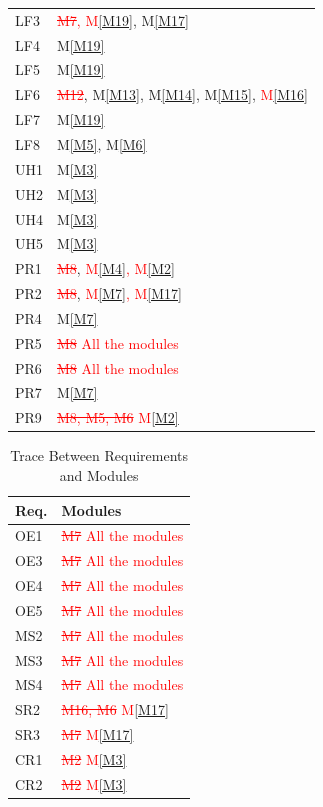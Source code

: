 \documentclass[12pt, titlepage]{article}
\newcommand{\mref}[1]{M\ref{#1}}
\begin{document}
\begin{table}[H]
\begin{tabular}{p{} p{}}
LF3 & \textcolor{red}{\sout{M7}, \mref{M19}}, \mref{M17}\\
LF4 & \mref{M19}\\
LF5 & \mref{M19}\\
LF6 & \textcolor{red}{\sout{M12}}, \mref{M13}, \mref{M14}, \mref{M15}, \textcolor{red}{\mref{M16}}\\
LF7 & \mref{M19}\\
LF8 & \mref{M5}, \mref{M6}\\
UH1 & \mref{M3}\\
UH2 & \mref{M3}\\
UH4 & \mref{M3}\\
UH5 & \mref{M3}\\
PR1 & \textcolor{red}{\sout{M8}}, \textcolor{red}{\mref{M4}, \mref{M2}}\\
PR2 & \textcolor{red}{\sout{M8}}, \textcolor{red}{\mref{M7}, \mref{M17}}\\
PR4 & \mref{M7}\\
PR5 & \textcolor{red}{\sout{M8} All the modules}\\
PR6 & \textcolor{red}{\sout{M8} All the modules}\\
PR7 & \mref{M7}\\
PR9 & \textcolor{red}{\sout{M8, M5, M6} \mref{M2}}\\
\bottomrule
\end{tabular}
\end{table}

\begin{table}[H]
\centering
\begin{tabular}{p{} p{}}
\toprule
\textbf{Req.} & \textbf{Modules}\\
\midrule
OE1 & \textcolor{red}{\sout{M7} All the modules}\\
OE3 & \textcolor{red}{\sout{M7} All the modules}\\
OE4 & \textcolor{red}{\sout{M7} All the modules}\\
OE5 & \textcolor{red}{\sout{M7} All the modules}\\
MS2 & \textcolor{red}{\sout{M7} All the modules}\\
MS3 & \textcolor{red}{\sout{M7} All the modules}\\
MS4 & \textcolor{red}{\sout{M7} All the modules}\\
SR2 & \textcolor{red}{\sout{M16, M6} \mref{M17}}\\
SR3 & \textcolor{red}{\sout{M7} \mref{M17}}\\
CR1 & \textcolor{red}{\sout{M2} \mref{M3}}\\
CR2 & \textcolor{red}{\sout{M2} \mref{M3}}\\
\bottomrule
\end{tabular}
\caption{Trace Between Requirements and Modules}
\label{TblRT}
\end{table}
\end{document}
